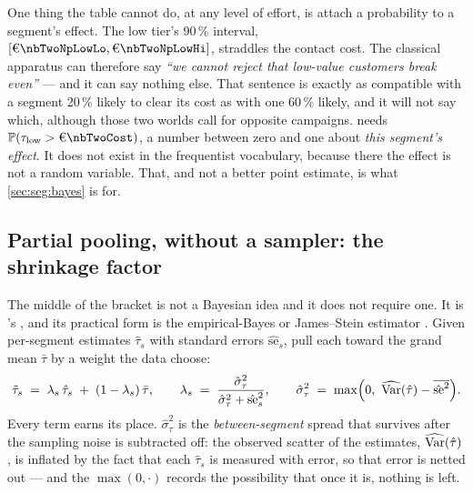 One thing the table cannot do, at any level of effort, is attach a probability to a segment's
effect. The low tier's 90\,\% interval, $[\eur{\nbTwoNpLowLo}, \eur{\nbTwoNpLowHi}]$, straddles the
\eur{\nbTwoCost} contact cost. The classical apparatus can therefore say \emph{``we cannot reject
that low-value customers break even''} --- and it can say nothing else. That sentence is exactly as
compatible with a segment 20\,\% likely to clear its cost as with one 60\,\% likely, and it will not
say which, although those two worlds call for opposite campaigns.  needs
$\Prob(\tau_{\mathrm{low}} > \eur{\nbTwoCost})$, a number between zero and one about \emph{this
segment's effect}. It does not exist in the frequentist vocabulary, because there the effect is not
a random variable. That, and not a better point estimate, is what \cref{sec:seg:bayes} is for.

\subsection*{Partial pooling, without a sampler: the shrinkage factor}

The middle of the bracket is not a Bayesian idea and it does not require one. It is
\citeauthor{stein1956}'s \citeyearpar{stein1956}, and its practical form is the empirical-Bayes or
James--Stein estimator \citep{james1961, efron1975}. Given per-segment estimates $\hat\tau_s$ with
standard errors $\hat{\mathrm{se}}_s$, pull each toward the grand mean $\bar\tau$ by a weight the
data choose:
%
\begin{equation}
  \tilde\tau_s \;=\; \lambda_s\,\hat\tau_s \;+\; (1 - \lambda_s)\,\bar\tau,
  \qquad
  \lambda_s \;=\; \frac{\hat\sigma^2_\tau}{\hat\sigma^2_\tau + \hat{\mathrm{se}}_s^2},
  \qquad
  \hat\sigma^2_\tau \;=\; \max\!\Big(0,\ \widehat{\operatorname{Var}}(\hat\tau)
                                        - \overline{\hat{\mathrm{se}}^2}\Big).
  \label{eq:seg:shrink}
\end{equation}
%
Every term earns its place. $\hat\sigma^2_\tau$ is the \emph{between-segment} spread that survives
after the sampling noise is subtracted off: the observed scatter of the estimates,
$\widehat{\operatorname{Var}}(\hat\tau)$, is inflated by the fact that each $\hat\tau_s$ is measured with error,
so that error is netted out --- and the $\max(0, \cdot)$ records the possibility that once it is,
nothing is left.


